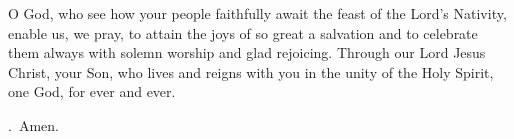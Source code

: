 \lettrine[lines=3]{O}{} God, who see how your people
faithfully await the feast of the Lord’s Nativity,
enable us, we pray,
to attain the joys of so great a salvation
and to celebrate them always
with solemn worship and glad rejoicing.
Through our Lord Jesus Christ, your Son,
who lives and reigns with you in the unity of the Holy Spirit,
one God, for ever and ever. \par \Rbar.~Amen.

